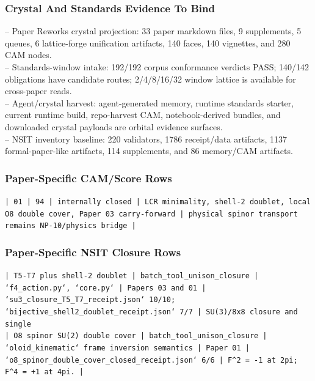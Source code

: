 \documentclass[11pt]{article}
\begin{document}
\subsubsection*{Crystal And Standards Evidence To Bind}

\noindent{}-- Paper Reworks crystal projection: 33 paper markdown files, 9 supplements, 5 queues, 6 lattice-forge unification artifacts, 140 faces, 140 vignettes, and 280 CAM nodes.\\
\noindent{}-- Standards-window intake: 192/192 corpus conformance verdicts PASS; 140/142 obligations have candidate routes; 2/4/8/16/32 window lattice is available for cross-paper reads.\\
\noindent{}-- Agent/crystal harvest: agent-generated memory, runtime standards starter, current runtime build, repo-harvest CAM, notebook-derived bundles, and downloaded crystal payloads are orbital evidence surfaces.\\
\noindent{}-- NSIT inventory baseline: 220 validators, 1786 receipt/data artifacts, 1137 formal-paper-like artifacts, 114 supplements, and 86 memory/CAM artifacts.\\

\subsubsection*{Paper-Specific CAM/Score Rows}

\noindent\texttt{| 01 | 94 | internally closed | LCR minimality, shell-2 doublet, local O8 double cover, Paper 03 carry-forward | physical spinor transport remains NP-10/physics bridge |}\\

\subsubsection*{Paper-Specific NSIT Closure Rows}

\noindent\texttt{| T5-T7 plus shell-2 doublet | batch\_tool\_unison\_closure | `f4\_action.py`, `core.py` | Papers 03 and 01 | `su3\_closure\_T5\_T7\_receipt.json` 10/10; `bijective\_shell2\_doublet\_receipt.json` 7/7 | SU(3)/8x8 closure and single}\\
\noindent\texttt{| O8 spinor SU(2) double cover | batch\_tool\_unison\_closure | `oloid\_kinematic` frame inversion semantics | Paper 01 | `o8\_spinor\_double\_cover\_closed\_receipt.json` 6/6 | F\textasciicircum{}2 = -1 at 2pi; F\textasciicircum{}4 = +1 at 4pi. |}\\
\end{document}
